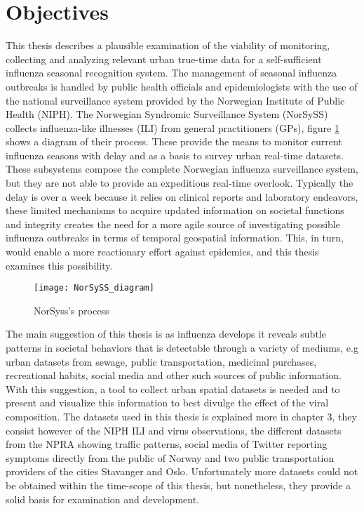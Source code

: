 \section{Objectives}
This thesis describes a plausible examination of the viability of monitoring, collecting and analyzing relevant urban true-time data for a self-sufficient influenza seasonal recognition system. The management of seasonal influenza outbreaks is handled by public health officials and epidemiologists with the use of the national surveillance system provided by the Norwegian Institute of Public Health (NIPH)\cite{niph}. The Norwegian Syndromic Surveillance System (NorSySS) collects influenza-like illnesses (ILI) from general practitioners (GPs)\cite{NorSySS}, figure \ref{fig:norsyss} shows a diagram of their process. These provide the means to monitor current influenza seasons with delay and as a basis to survey urban real-time datasets. These subsystems compose the complete Norwegian influenza surveillance system, but they are not able to provide an expeditious real-time overlook. Typically the delay is over a week because it relies on clinical reports and laboratory endeavors, these limited mechanisms to acquire updated information on societal functions and integrity creates the need for a more agile source of investigating possible influenza outbreaks in terms of temporal geospatial information. This, in turn, would enable a more reactionary effort against epidemics, and this thesis examines this possibility.

\begin{figure}[h]
\texttt{[image: NorSySS\_diagram]}
\centering
\caption{NorSyss's process}
\label{fig:norsyss}
\end{figure}

The main suggestion of this thesis is as influenza develops it reveals subtle patterns in societal behaviors that is detectable through a variety of mediums, e.g urban datasets from sewage, public transportation, medicinal purchases, recreational habits, social media and other such sources of public information. With this suggestion, a tool to collect urban spatial datasets is needed and to present and visualize this information to best divulge the effect of the viral composition. The datasets used in this thesis is explained more in chapter 3, they consist however of the NIPH ILI and virus observations, the different datasets from the NPRA showing traffic patterns, social media of Twitter reporting symptoms directly from the public of Norway and two public transportation providers of the cities Stavanger and Oslo. Unfortunately more datasets could not be obtained within the time-scope of this thesis, but nonetheless, they provide a solid basis for examination and development.

